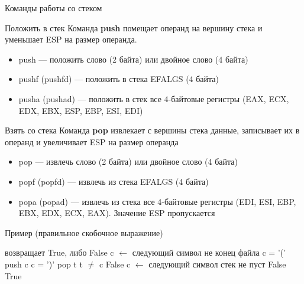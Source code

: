 \documentclass[utf8, russian]{beamer}
\begin{document}
    \begin{frame}{Команды работы со стеком}
        \begin{block}{Положить в стек}\small
            Команда {\bf push} помещает операнд на вершину стека и уменьшает ESP на размер операнда.
            \begin{itemize}
                \item push --- положить слово (2 байта) или двойное слово (4 байта)
                \item pushf (pushfd) --- положить в стека EFALGS (4 байта)
                \item pusha (pushad) --- положить в стек все 4-байтовые регистры (EAX, ECX, EDX, EBX, ESP, EBP, ESI, EDI) 
            \end{itemize}
        \end{block}
        \begin{block}{Взять со стека}\small
            Команда {\bf pop} извлекает с вершины стека данные, записывает их в операнд и увеличивает ESP на размер операнда
            \begin{itemize}
                \item pop --- извлечь слово (2 байта) или двойное слово (4 байта)
                \item popf (popfd) --- извлечь из стека EFALGS (4 байта)
                \item popa (popad) --- извлечь из стека все 4-байтовые регистры (EDI, ESI, EBP, EBX, EDX, ECX, EAX). Значение ESP пропускается             
            \end{itemize}
        \end{block}
    \end{frame}
    \begin{frame}{Пример (правильное скобочное выражение)}
        \begin{codebox}
            \li \Comment возвращает True, либо False
            \li c $\leftarrow$ следующий символ
            \li \While не конец файла
            \li \Do \If c = '(' 
            \li     \Then push c
            \li     \Else \If c = ')'
            \li           \Then pop t
            \li                 \If t $\ne$ c
            \li                 \Then \Return False
                                \End
                          \End
                    \End
            \li     c $\leftarrow$ следующий символ
                \End
            \li \If стек не пуст
            \li \Then \Return False
            \li \Else \Return True
        \end{codebox}
    \end{frame}
\end{document}
